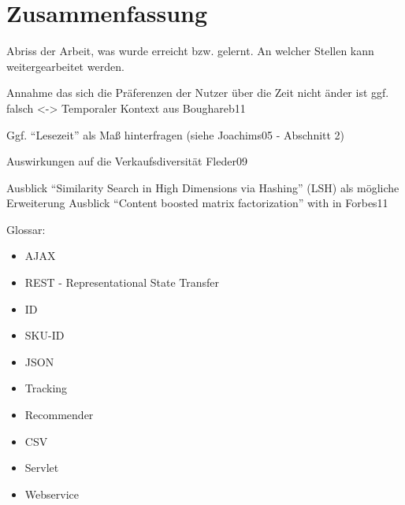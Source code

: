 
\section{Zusammenfassung}

	Abriss der Arbeit, was wurde erreicht bzw. gelernt. An welcher Stellen kann weitergearbeitet werden. 


Annahme das sich die Präferenzen der Nutzer über die Zeit nicht änder ist ggf. falsch <-> Temporaler Kontext aus Boughareb11 

Ggf. ``Lesezeit'' als Maß hinterfragen (siehe Joachims05 - Abschnitt 2)

Auswirkungen auf die Verkaufsdiversität Fleder09

Ausblick ``Similarity Search in High Dimensions via Hashing'' (LSH) als mögliche Erweiterung
Ausblick ``Content boosted matrix factorization'' with in Forbes11



Glossar:
\begin{itemize}
\item AJAX
\item REST - Representational State Transfer
\item ID
\item SKU-ID
\item JSON
\item Tracking
\item Recommender
\item CSV
\item Servlet
\item Webservice
\end{itemize}